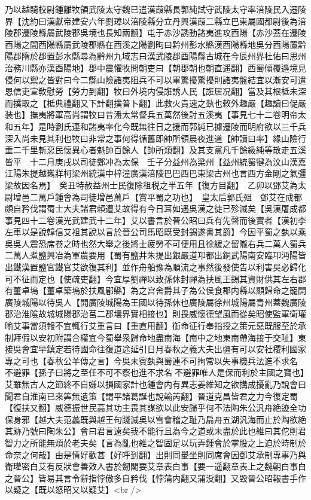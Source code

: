 乃以越騎校尉鍾離牧領武陵太守魏已遣漢葭縣長郭純試守武陵太守率涪陵民入遷陵界【沈約曰漢獻帝建安六年劉璋以涪陵縣分立丹興漢葭二縣立巴東屬國都尉後為涪陵郡遷陵縣屬武陵郡吳境也長知兩翻】屯于赤沙誘動諸夷進攻酉陽【赤沙蓋在遷陵酉陽之間酉陽縣屬武陵郡縣在酉溪之陽劉昫曰黔州彭水縣漢酉陽縣地吳分酉陽置黔陽郡隋於郡置彭水縣尋為黔州九域志曰漢武陵郡酉陽縣古城在今辰州界杜佑曰思州治務川縣亦漢酉陽地】郡中震懼牧問朝吏曰【朝郡朝也朝直遥翻】西蜀傾覆邉境見侵何以禦之皆對曰今二縣山險諸夷阻兵不可以軍驚擾驚擾則諸夷盤結宜以漸安可遣恩信吏宣敎慰勞【勞力到翻】牧曰外境内侵誑誘人民【誑居况翻】當及其根柢未深而撲取之【柢典禮翻又下計翻撲普卜翻】此救火貴速之埶也敕外趣嚴【趣讀曰促嚴装也】撫夷將軍高尚謂牧曰昔潘太常督兵五萬然後討五溪夷【事見七十二卷明帝太和五年】是時劉氏連和諸夷率化今既無往日之援而郭純已據遷陵而明府欲以三千兵深入尚未見其利也牧曰非常之事何得循舊即帥所領晨夜進道【帥讀曰率】緣山險行垂二千里斬惡民懷異心者魁帥百餘人【帥所類翻】及其支黨凡千餘級純等散走五溪皆平　十二月庚戌以司徒鄭冲為太保　壬子分益州為梁州【益州統蜀犍為汶山漢嘉江陽朱提越嶲牂柯梁州統漢中梓潼廣漢涪陵巴巴西巴東梁古州也言西方金剛之氣彊梁故因名焉】　癸丑特赦益州士民復除租税之半五年【復方目翻】　乙卯以鄧艾為太尉增邑二萬戶鍾會為司徒增邑萬戶【賞平蜀之功也】　皇太后郭氏殂　鄧艾在成都頗自矜伐謂蜀士大夫諸君賴遭艾故得有今日耳如遇吳漢之徒已殄滅矣【吳漢屠成都事見四十二卷漢光武建武十二年】艾以書言於晉公昭曰兵有先聲而後實者【漢初李左車以是說韓信艾祖其說以言於晉公司馬昭既受封錫遂書其爵】今因平蜀之埶以乘吳吳人震恐席卷之時也然大舉之後將士疲勞不可便用且徐緩之留隴右兵二萬人蜀兵二萬人煮鹽興冶為軍農要用【蜀有鹽井朱提出銀嚴道卭都出銅武陽南安臨卭沔陽皆出鐵漢置鹽官鐵官艾欲復其利】並作舟船豫為順流之事然後發使告以利害吳必歸化可不征而定也【使疏吏翻】今宜厚劉禪以致孫休封禪為扶風王錫其資財供其左右郡有董卓塢【董卓築塢於扶風郿縣】為之宫舍爵其子為公侯食郡内縣以顯歸命之寵開廣陵城陽以待吳人【開廣陵城陽為王國以待孫休也廣陵屬徐州城陽屬青州蓋魏廣陵郡治淮隂故城城陽郡治莒二郡壤界實相接也】則畏威懷德望風而從矣昭使監軍衛瓘喻艾事當須報不宜輒行艾重言曰【重直用翻】衘命征行奉指授之策元惡既服至於承制拜假以安初附謂合權宜今蜀舉衆歸命地盡南海【南中之地東南帶海接于交阯】東接吳會宜早鎮定若待國命往復道途延引日月春秋之義大夫出疆有可以安社稷利國家專之可也【春秋公羊傳之言】今吳未賓埶與蜀連不可拘常以失事機兵法進不求名不避罪【孫子曰將之至任不可不察也進不求名不避罪唯人是保而利於主國之寶也】艾雖無古人之節終不自嫌以損國家計也鍾會内有異志姜維知之欲搆成擾亂乃說會曰聞君自淮南已來筭無遺策【謂平諸葛誕也說輸芮翻】晉道克昌皆君之力今復定蜀【復扶又翻】威德振世民高其功主畏其謀欲以此安歸乎何不法陶朱公汎舟絶迹全功保身邪【越大夫范蠡既與越王句踐滅吳以雪會稽之耻乃扁舟五湖汎海而止於陶欲絶其跡乃號曰陶朱公】會曰君言遠矣我不能行且為今之道或未盡於此也維曰其佗則君智力之所能無煩於老夫矣【言為亂也維之智固足以玩弄鍾會於掌股之上迫於時制於命奈之何哉】由是情好歡甚【好呼到翻】出則同轝坐則同席會因鄧艾承制專事乃與衛瓘密白艾有反狀會善效人書於劒閣要艾章表白事【要一遥翻章表上之魏朝白事白之晉公】皆易其言令辭指悖傲多自矜伐【悖蒲内翻又蒲没翻】又毁晉公昭報書手作以疑之【既以怒昭又以疑艾】<br />
